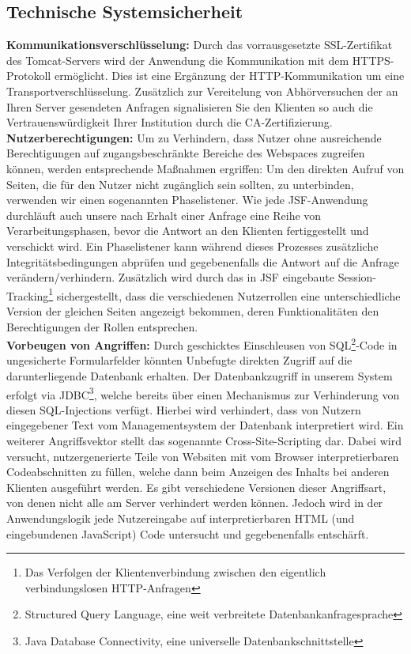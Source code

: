 \documentclass{article}
\begin{document}
\subsection{Technische Systemsicherheit}
\noindent \textbf{Kommunikationsverschlüsselung:} Durch das vorrausgesetzte SSL-Zertifikat des Tomcat-Servers wird der Anwendung die Kommunikation mit dem HTTPS-Protokoll ermöglicht. Dies ist eine Ergänzung der HTTP-Kommunikation um eine Transportverschlüsselung. Zusätzlich zur Vereitelung von Abhörversuchen der an Ihren Server gesendeten Anfragen signalisieren Sie den Klienten so auch die Vertrauenswürdigkeit Ihrer Institution durch die CA-Zertifizierung.\\
\textbf{Nutzerberechtigungen:} Um zu Verhindern, dass Nutzer ohne ausreichende Berechtigungen auf zugangsbeschränkte Bereiche des Webspaces zugreifen können, werden entsprechende Maßnahmen ergriffen: Um den direkten Aufruf von Seiten, die für den Nutzer nicht zugänglich sein sollten, zu unterbinden, verwenden wir einen sogenannten Phaselistener. Wie jede JSF-Anwendung durchläuft auch unsere nach Erhalt einer Anfrage eine Reihe von Verarbeitungsphasen, bevor die Antwort an den Klienten fertiggestellt und verschickt wird. Ein Phaselistener kann während dieses Prozesses zusätzliche Integritätsbedingungen abprüfen und gegebenenfalls die Antwort auf die Anfrage verändern/verhindern. Zusätzlich wird durch das in JSF eingebaute Session-Tracking\footnote{Das Verfolgen der Klientenverbindung zwischen den eigentlich verbindungslosen HTTP-Anfragen} sichergestellt, dass die verschiedenen Nutzerrollen eine unterschiedliche Version der gleichen Seiten angezeigt bekommen, deren Funktionalitäten den Berechtigungen der Rollen entsprechen. \\
\textbf{Vorbeugen von Angriffen:} Durch geschicktes Einschleusen von SQL\footnote{Structured Query Language, eine weit verbreitete Datenbankanfragesprache}-Code in ungesicherte Formularfelder könnten Unbefugte direkten Zugriff auf die darunterliegende Datenbank erhalten. Der Datenbankzugriff in unserem System erfolgt via JDBC\footnote{Java Database Connectivity, eine universelle Datenbankschnittstelle}, welche bereits über einen Mechanismus zur Verhinderung von diesen SQL-Injections verfügt. Hierbei wird verhindert, dass von Nutzern eingegebener Text vom Managementsystem der Datenbank interpretiert wird. Ein weiterer Angriffsvektor stellt das sogenannte Cross-Site-Scripting dar. Dabei wird versucht, nutzergenerierte Teile von Websiten mit vom Browser interpretierbaren Codeabschnitten zu füllen, welche dann beim Anzeigen des Inhalts bei anderen Klienten ausgeführt werden. Es gibt verschiedene Versionen dieser Angriffsart, von denen nicht alle am Server verhindert werden können. Jedoch wird in der Anwendungslogik jede Nutzereingabe auf interpretierbaren HTML (und eingebundenen JavaScript) Code untersucht und gegebenenfalls entschärft.
\end{document}
